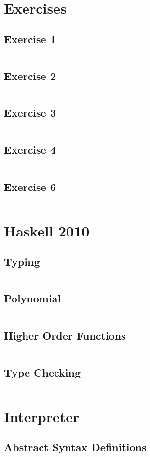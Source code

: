 \documentclass[a4paper,9pt]{article}
\newcommand{\hsfile}[1]{\inputminted[breaklines]{haskell}{../haskell/#1.hs}}
\begin{document}
\section{Exercises}
\subsection{Exercise 1}
\hsfile{ex01/ex01}
\subsection{Exercise 2}
\hsfile{ex02/ex02}
\subsection{Exercise 3}
\hsfile{ex03/ex03}
\subsection{Exercise 4}
\hsfile{ex04/ex04}
\subsection{Exercise 6}
\hsfile{ex06/ex06}
\section{Haskell 2010}
\subsection{Typing}
\hsfile{exam2010/problem_1}
\subsection{Polynomial}
\hsfile{exam2010/problem_2}
\subsection{Higher Order Functions}
\hsfile{exam2010/problem_3}
\subsection{Type Checking}
\hsfile{exam2010/problem_4}
\section{Interpreter}
\subsection{Abstract Syntax Definitions}
\hsfile{interpreter/AbsSyn}
\end{document}
